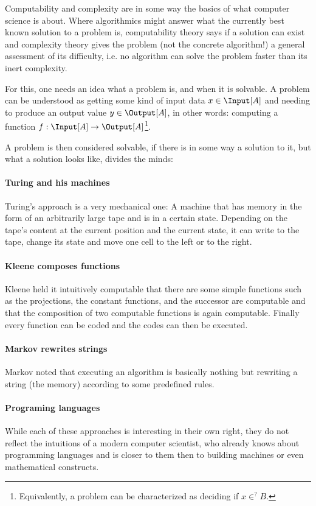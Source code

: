 Computability and complexity are in some way the basics of what computer
science is about. Where algorithmics might answer what the currently best known
solution to a problem is, computability theory says if a solution can exist and
complexity theory gives the problem (not the concrete algorithm!) a general
assessment of its difficulty, i.e. no algorithm can solve the problem faster 
than its inert complexity.

For this, one needs an idea what a problem is, and when it is solvable. A 
problem can be understood as getting some kind of input data $x\in \Input[A]$ 
and needing to produce an output value $y\in \Output[A]$, in other words: 
computing a function $f:\Input[A] \rightarrow \Output[A]$\footnote{Equivalently, 
a problem can be characterized as deciding if $x\in^? B$.}.

A problem is then considered solvable, if there is in some way a solution to 
it, but what a solution looks like, divides the minds: 

\paragraph{Turing and his machines}
Turing's approach is a very mechanical one: A machine that has memory in the 
form of an arbitrarily large tape and is in a certain state. Depending on the 
tape's content at the current position and the current state, it can write to 
the tape, change its state and move one cell to the left or to the right.

\paragraph{Kleene composes functions}
Kleene held it intuitively computable that there are some simple functions 
such as the projections, the constant functions, and the successor are 
computable and that the composition of two computable functions is again 
computable. Finally every function can be coded and the codes can then be executed.

\paragraph{Markov rewrites strings}
Markov noted that executing an algorithm is basically nothing but rewriting a 
string (the memory) according to some predefined rules.

\paragraph{Programing languages}
While each of these approaches is interesting in their own right, they do not 
reflect the intuitions of a modern computer scientist, who already knows 
about programming languages and is closer to them then to building machines 
or even mathematical constructs.

